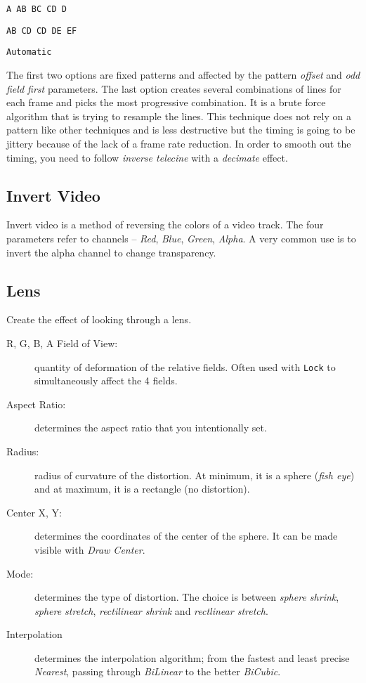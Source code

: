 \texttt{A AB BC CD D}

\texttt{AB CD CD DE EF}

\texttt{Automatic}

The first two options are fixed patterns and affected by the pattern \textit{offset} and \textit{odd field first} parameters. The last option creates several combinations of lines for each frame and picks the most progressive combination. It is a brute force algorithm that is trying to resample the lines. This technique does not rely on a pattern like other techniques and is less destructive but the timing is going to be jittery because of the lack of a frame rate reduction. In order to smooth out the timing, you need to follow \textit{inverse telecine} with a \textit{decimate} effect.

\subsection{Invert Video}%
\label{sub:invert_video}

Invert video is a method of reversing the colors of a video track. The four parameters refer to channels -- \textit{Red}, \textit{Blue}, \textit{Green}, \textit{Alpha}. A very common use is to invert the alpha channel to change transparency.

\subsection{Lens}%
\label{sub:lens}

Create the effect of looking through a lens.

\begin{description}
    \item[R, G, B, A Field of View:] quantity of deformation of the relative fields. Often used with \texttt{Lock} to simultaneously affect the 4 fields.
    \item[Aspect Ratio:] determines the aspect ratio that you intentionally set.
    \item[Radius:] radius of curvature of the distortion. At minimum, it is a sphere (\textit{fish eye}) and at maximum, it is a rectangle (no distortion).
    \item[Center X, Y:] determines the coordinates of the center of the sphere. It can be made visible with \textit{Draw Center}.
    \item[Mode:] determines the type of distortion. The choice is between \textit{sphere shrink}, \textit{sphere stretch}, \textit{rectilinear shrink} and \textit{rectlinear stretch}.
    \item[Interpolation] determines the interpolation algorithm; from the fastest and least precise \textit{Nearest}, passing through \textit{BiLinear} to the better \textit{BiCubic}.
\end{description}

